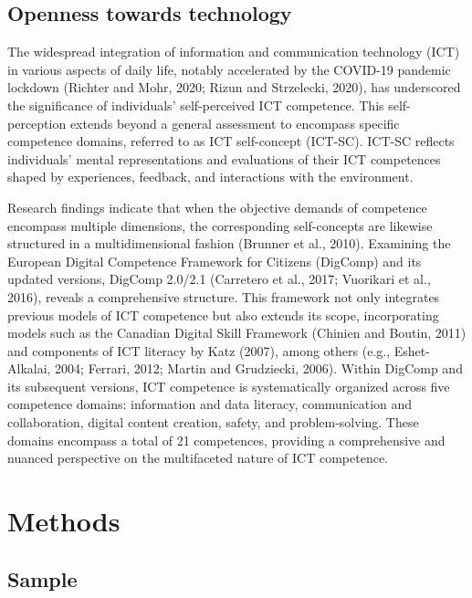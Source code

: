 \documentclass[
  12pt,
  a4paper,
  twoside]{article}
\begin{document}
\hypertarget{openness-towards-technology}{%
\subsection{Openness towards technology}\label{openness-towards-technology}}

The widespread integration of information and communication technology (ICT) in various aspects of daily life, notably accelerated by the COVID-19 pandemic lockdown (Richter and Mohr, 2020; Rizun and Strzelecki, 2020), has underscored the significance of individuals' self-perceived ICT competence. This self-perception extends beyond a general assessment to encompass specific competence domains, referred to as ICT self-concept (ICT-SC). ICT-SC reflects individuals' mental representations and evaluations of their ICT competences shaped by experiences, feedback, and interactions with the environment.

Research findings indicate that when the objective demands of competence encompass multiple dimensions, the corresponding self-concepts are likewise structured in a multidimensional fashion (Brunner et al., 2010). Examining the European Digital Competence Framework for Citizens (DigComp) and its updated versions, DigComp 2.0/2.1 (Carretero et al., 2017; Vuorikari et al., 2016), reveals a comprehensive structure. This framework not only integrates previous models of ICT competence but also extends its scope, incorporating models such as the Canadian Digital Skill Framework (Chinien and Boutin, 2011) and components of ICT literacy by Katz (2007), among others (e.g., Eshet-Alkalai, 2004; Ferrari, 2012; Martin and Grudziecki, 2006).
Within DigComp and its subsequent versions, ICT competence is systematically organized across five competence domains: information and data literacy, communication and collaboration, digital content creation, safety, and problem-solving. These domains encompass a total of 21 competences, providing a comprehensive and nuanced perspective on the multifaceted nature of ICT competence.

\hypertarget{methods}{%
\section{Methods}\label{methods}}

\hypertarget{sample}{%
\subsection{Sample}\label{sample}}
\end{document}
